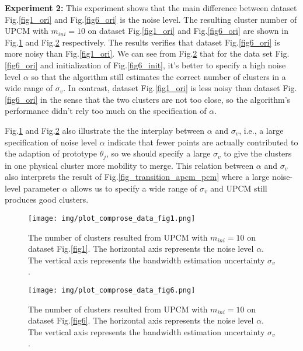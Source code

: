\documentclass[journal]{IEEEtran}
\theoremstyle{definition}
\begin{document}
\textbf{Experiment 2:} This experiment shows that the main difference between dataset Fig.\ref{fig1_ori} and Fig.\ref{fig6_ori} is the noise level. 
The resulting cluster number of UPCM with $m_{ini}=10$ on dataset Fig.\ref{fig1_ori} and Fig.\ref{fig6_ori} are shown in Fig.\ref{fig1_comprose} and Fig.\ref{fig6_comprose} respectively. The results verifies that dataset Fig.\ref{fig6_ori} is more noisy than Fig.\ref{fig1_ori}. 
We can see from Fig.\ref{fig6_comprose} that for the data set Fig.\ref{fig6_ori} and initialization of Fig.\ref{fig6_init}, it's better to specify a high noise level $\alpha$ so that the algorithm still estimates the correct number of clusters in a wide range of $\sigma_v$. In contrast, dataset Fig.\ref{fig1_ori} is less noisy than dataset Fig.\ref{fig6_ori} in the sense that the two clusters are not too close, so the algorithm's performance didn't rely too much on the specification of $\alpha$.

Fig.\ref{fig1_comprose} and Fig.\ref{fig6_comprose} also illustrate the the interplay between $\alpha$ and $\sigma_v$, i.e., a large specification of noise level $\alpha$ indicate that fewer points are actually contributed to the adaption of prototype $\theta_j$, so we should specify a large $\sigma_v$ to give the clusters in one physical cluster more mobility to merge. This relation between $\alpha$ and $\sigma_v$ also interprets the result of 
Fig.\ref{fig_transition_apcm_pcm} where a large noise-level parameter $\alpha$ allows us to specify a wide range of $\sigma_v$ and UPCM still produces good clusters.
\begin{figure}[htb]
\centering
\texttt{[image: img/plot\_comprose\_data\_fig1.png]}
\caption{\label{fig1_comprose}The number of clusters resulted from UPCM with $m_{ini}=10$ on dataset Fig.\ref{fig1}. The horizontal axis represents the noise level $\alpha$. The vertical axis represents the bandwidth estimation uncertainty $\sigma_v$.}
\end{figure}
\begin{figure}[htb]
\centering
\texttt{[image: img/plot\_comprose\_data\_fig6.png]}
\caption{\label{fig6_comprose}The number of clusters resulted from UPCM with $m_{ini}=10$ on dataset Fig.\ref{fig6}. The horizontal axis represents the noise level $\alpha$. The vertical axis represents the bandwidth estimation uncertainty $\sigma_v$.}
\end{figure}
\end{document}
